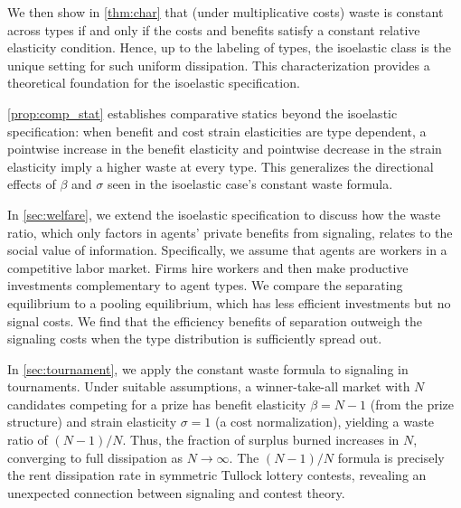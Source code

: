 \documentclass[12 pt]{article}
\theoremstyle{remark}
\theoremstyle{definition}
\begin{document}
We then show in \autoref{thm:char} that (under multiplicative costs) waste is constant across types {if and only if} the costs and benefits satisfy a constant relative elasticity condition. Hence, up to the labeling of types, the isoelastic class is the unique setting for such uniform dissipation. This characterization provides a theoretical foundation for the isoelastic specification. 

\autoref{prop:comp_stat} establishes comparative statics beyond the isoelastic specification: when benefit and cost strain elasticities are type dependent, a pointwise increase in the benefit elasticity and pointwise decrease in the strain elasticity imply a higher waste at every type. This generalizes the directional effects of $\beta$ and $\sigma$ seen in the isoelastic case's constant waste formula.




In \autoref{sec:welfare}, we extend the isoelastic specification to discuss how the waste ratio, which only factors in agents’ private benefits from signaling, relates to the social value of information. Specifically, we assume that agents are workers in a competitive labor market. Firms hire workers and then make productive investments complementary to agent types. We compare the separating equilibrium to a pooling equilibrium, which has less efficient investments but no signal costs. We find that the efficiency benefits of separation outweigh the signaling costs when the type distribution is sufficiently spread out.

In \autoref{sec:tournament}, we apply the constant waste formula to signaling in tournaments. Under suitable assumptions, a winner-take-all market with $N$ candidates competing for a prize has benefit elasticity $\beta = N-1$ (from the prize structure) and strain elasticity $\sigma=1$ (a cost normalization), yielding a waste ratio of $(N-1)/N$. Thus, the fraction of surplus burned increases in $N$, converging to full dissipation as $N \to \infty$. The $(N-1)/N$ formula is precisely the rent dissipation rate in symmetric Tullock lottery contests, revealing an unexpected connection between signaling and contest theory.
\end{document}
